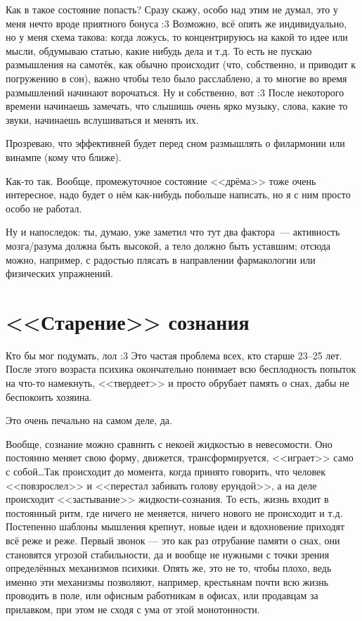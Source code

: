 \documentclass[a5paper,12pt,twoside]{memoir}
\begin{document}
Как в такое состояние попасть? Сразу скажу, особо над этим не думал, это у меня нечто вроде приятного бонуса :3 Возможно, всё опять же индивидуально, но у меня схема такова: когда ложусь, то концентрируюсь на какой то идее или мысли, обдумываю статью, какие нибудь дела и т.д. То есть не пускаю размышления на самотёк, как обычно происходит (что, собственно, и приводит к погружению в сон), важно чтобы тело было расслаблено, а то многие во время размышлений начинают ворочаться. Ну и собственно, вот :3 После некоторого времени начинаешь замечать, что слышишь очень ярко музыку, слова, какие то звуки, начинаешь вслушиваться и менять их.
 
Прозреваю, что эффективней будет перед сном размышлять о филармонии или винампе (кому что ближе).
 
Как-то так. Вообще, промежуточное состояние <<дрёма>> тоже очень интересное, надо будет о нём как-нибудь побольше написать, но я с ним просто особо не работал.
 
Ну и напоследок: ты, думаю, уже заметил что тут два фактора~--- активность мозга/разума должна быть высокой, а тело должно быть уставшим; отсюда можно, например, с радостью плясать в направлении фармакологии или физических упражнений. 




\section{<<Старение>> сознания}


\medskip
Кто бы мог подумать, лол :3 Это частая проблема всех, кто старше 23--25 лет. После этого возраста психика окончательно понимает всю бесплодность попыток на что-то намекнуть, <<твердеет>> и просто обрубает память о снах, дабы не беспокоить хозяина.
 
Это очень печально на самом деле, да. 

Вообще, сознание можно сравнить с некоей жидкостью в невесомости. Оно постоянно меняет свою форму, движется, трансформируется, <<играет>> само с собой\ldots Так происходит до момента, когда принято говорить, что человек <<повзрослел>> и <<перестал забивать голову ерундой>>, а на деле происходит <<застывание>> жидкости-сознания. То есть, жизнь входит в постоянный ритм, где ничего не меняется, ничего нового не происходит и т.д. Постепенно шаблоны мышления крепнут, новые идеи и вдохновение приходят всё реже и реже. 
Первый звонок — это как раз отрубание памяти о снах, они становятся угрозой стабильности, да и вообще не нужными с точки зрения определённых механизмов психики. Опять же, это не то, чтобы плохо, ведь именно эти механизмы позволяют, например, крестьянам почти всю жизнь проводить в поле, или офисным работникам в офисах, или продавцам за прилавком, при этом не сходя с ума от этой монотонности. 
\end{document}
